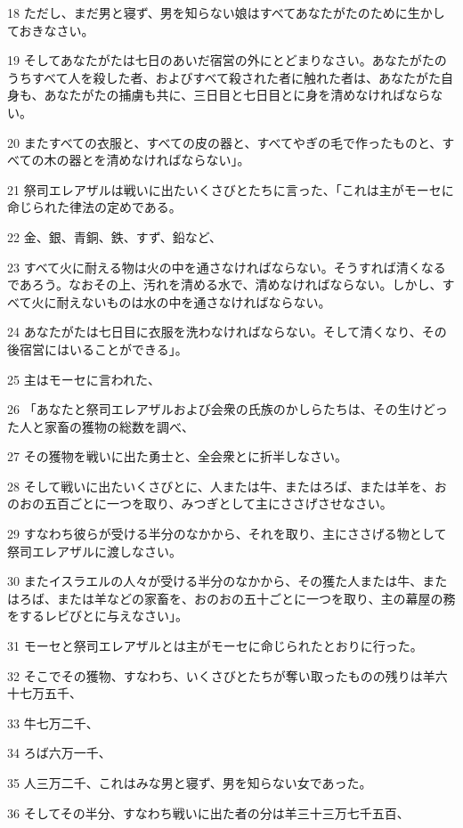 \par 18 ただし、まだ男と寝ず、男を知らない娘はすべてあなたがたのために生かしておきなさい。
\par 19 そしてあなたがたは七日のあいだ宿営の外にとどまりなさい。あなたがたのうちすべて人を殺した者、およびすべて殺された者に触れた者は、あなたがた自身も、あなたがたの捕虜も共に、三日目と七日目とに身を清めなければならない。
\par 20 またすべての衣服と、すべての皮の器と、すべてやぎの毛で作ったものと、すべての木の器とを清めなければならない」。
\par 21 祭司エレアザルは戦いに出たいくさびとたちに言った、「これは主がモーセに命じられた律法の定めである。
\par 22 金、銀、青銅、鉄、すず、鉛など、
\par 23 すべて火に耐える物は火の中を通さなければならない。そうすれば清くなるであろう。なおその上、汚れを清める水で、清めなければならない。しかし、すべて火に耐えないものは水の中を通さなければならない。
\par 24 あなたがたは七日目に衣服を洗わなければならない。そして清くなり、その後宿営にはいることができる」。
\par 25 主はモーセに言われた、
\par 26 「あなたと祭司エレアザルおよび会衆の氏族のかしらたちは、その生けどった人と家畜の獲物の総数を調べ、
\par 27 その獲物を戦いに出た勇士と、全会衆とに折半しなさい。
\par 28 そして戦いに出たいくさびとに、人または牛、またはろば、または羊を、おのおの五百ごとに一つを取り、みつぎとして主にささげさせなさい。
\par 29 すなわち彼らが受ける半分のなかから、それを取り、主にささげる物として祭司エレアザルに渡しなさい。
\par 30 またイスラエルの人々が受ける半分のなかから、その獲た人または牛、またはろば、または羊などの家畜を、おのおの五十ごとに一つを取り、主の幕屋の務をするレビびとに与えなさい」。
\par 31 モーセと祭司エレアザルとは主がモーセに命じられたとおりに行った。
\par 32 そこでその獲物、すなわち、いくさびとたちが奪い取ったものの残りは羊六十七万五千、
\par 33 牛七万二千、
\par 34 ろば六万一千、
\par 35 人三万二千、これはみな男と寝ず、男を知らない女であった。
\par 36 そしてその半分、すなわち戦いに出た者の分は羊三十三万七千五百、
